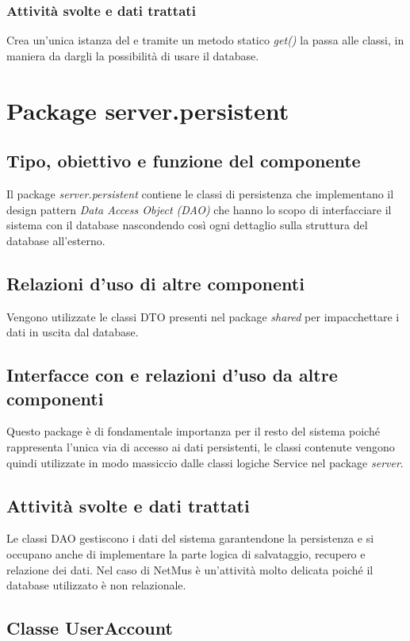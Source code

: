 \subsubsection*{Attivit\`a svolte e dati trattati}
Crea un'unica istanza del  e tramite un metodo
statico \emph{get()} la passa alle classi, in maniera da dargli la possibilit\`a
di usare il database.


\section{Package server.persistent} %
\subsection*{Tipo, obiettivo e funzione del componente}
Il package \emph{server.persistent} contiene le classi di persistenza che
implementano il design pattern \emph{Data Access Object (DAO)} che hanno lo
scopo di interfacciare il sistema con il database nascondendo cos\`i ogni
dettaglio sulla struttura del database all'esterno. 
\subsection*{Relazioni d'uso di altre componenti}
Vengono utilizzate le classi DTO presenti nel package \emph{shared} per
impacchettare i dati in uscita dal database. 
\subsection*{Interfacce con e relazioni d'uso da altre componenti}
Questo package \`e di fondamentale importanza per il resto del sistema poich\'e
rappresenta l'unica via di accesso ai dati persistenti, le classi contenute
vengono quindi utilizzate in modo massiccio dalle classi logiche Service nel
package \emph{server}.
\subsection*{Attivit\`a svolte e dati trattati}
Le classi DAO gestiscono i dati del sistema garantendone la persistenza e si
occupano anche di implementare la parte logica di salvataggio, recupero e
relazione dei dati. Nel caso di NetMus \`e un'attivit\`a molto delicata poich\'e il
database utilizzato \`e non relazionale.

\subsection{Classe UserAccount}
